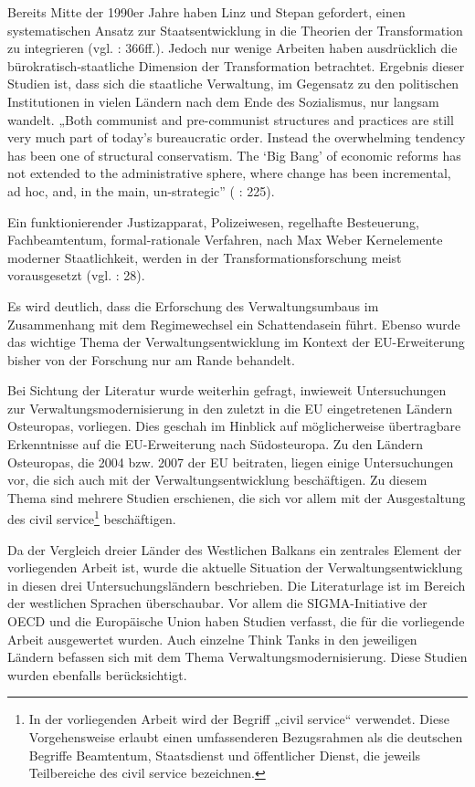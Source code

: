 \par
Bereits Mitte der 1990er Jahre haben Linz und Stepan gefordert, einen systematischen Ansatz zur Staatsentwicklung in die Theorien der Transformation zu integrieren (vgl. \cite{linz} : 366ff.). Jedoch nur wenige Arbeiten haben ausdrücklich die bürokratisch-staatliche Dimension der Transformation betrachtet. Ergebnis dieser Studien ist, dass sich die staatliche Verwaltung, im Gegensatz zu den politischen Institutionen in vielen Ländern nach dem Ende des Sozialismus, nur langsam wandelt. „Both communist and pre-communist structures and practices are still very much part of today’s bureaucratic order. Instead the overwhelming tendency has been one of structural conservatism. The ‘Big Bang’ of economic reforms has not extended to the administrative sphere, where change has been incremental, ad hoc, and, in the main, un-strategic” (\cite{dimgoe} : 225). 
\par
Ein funktionierender Justizapparat, Polizeiwesen, regelhafte Besteuerung, Fachbeamtentum, formal-rationale Verfahren, nach Max Weber Kernelemente moderner Staatlichkeit, werden in der Transformationsforschung meist vorausgesetzt (vgl. \cite{hens09} : 28).
\par
Es wird deutlich, dass die Erforschung des Verwaltungsumbaus im Zusammenhang mit dem Regimewechsel ein Schattendasein führt. Ebenso wurde das wichtige Thema der Verwaltungsentwicklung im Kontext der EU-Erweiterung bisher von der Forschung nur am Rande behandelt.
\par
Bei Sichtung der Literatur wurde weiterhin gefragt, inwieweit Untersuchungen zur Verwaltungsmodernisierung in den zuletzt in die EU eingetretenen Ländern Osteuropas, vorliegen. Dies geschah im Hinblick auf möglicherweise übertragbare Erkenntnisse auf die EU-Erweiterung nach Südosteuropa. Zu den Ländern Osteuropas, die 2004 bzw. 2007 der EU beitraten, liegen einige Untersuchungen vor, die sich auch mit der Verwaltungsentwicklung beschäftigen. Zu diesem Thema sind mehrere Studien erschienen, die sich vor allem mit der Ausgestaltung des civil service\footnote{In der vorliegenden Arbeit wird der Begriff „civil service“ verwendet. Diese Vorgehensweise erlaubt einen umfassenderen Bezugsrahmen als die deutschen Begriffe Beamtentum, Staatsdienst und öffentlicher Dienst, die jeweils Teilbereiche des civil service bezeichnen.} beschäftigen.
\par
Da der Vergleich dreier Länder des Westlichen Balkans ein zentrales Element der vorliegenden Arbeit ist, wurde die aktuelle Situation der Verwaltungsentwicklung in diesen drei Untersuchungsländern beschrieben. Die Literaturlage ist im Bereich der westlichen Sprachen überschaubar. Vor allem die SIGMA-Initiative der OECD und die Europäische Union haben Studien verfasst, die für die vorliegende Arbeit ausgewertet wurden. Auch einzelne Think Tanks in den jeweiligen Ländern befassen sich mit dem Thema Verwaltungsmodernisierung. Diese Studien wurden ebenfalls berücksichtigt.
